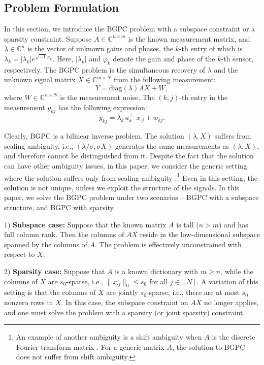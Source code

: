 \documentclass[11pt,journal]{IEEEtran}
\newcommand{\bbC}{\mathbb{C}}
\newcommand{\norm}[1]{\|{#1}\|}
\newcommand{\T}{\top}
\newcommand{\diag}{\mathrm{diag}}
\begin{document}

\subsection{Problem Formulation} \label{sec:formulation}
In this section, we introduce the BGPC problem with a subspace constraint or a sparsity constraint. Suppose $A\in\bbC^{n\times m}$ is the known measurement matrix, and $\lambda \in\bbC^{n}$ is the vector of unknown gains and phases, the $k$-th entry of which is $\lambda_k = |\lambda_k|e^{\sqrt{-1}\varphi_k}$. Here, $|\lambda_k|$ and $\varphi_k$ denote the gain and phase of the $k$-th sensor, respectively. The BGPC problem is the simultaneous recovery of $\lambda$ and the unknown signal matrix $X\in\bbC^{m\times N}$ from the following measurement:
\begin{equation}
\label{eq:bgpc}
Y = \diag(\lambda) A X + W,
\end{equation}
where $W\in\bbC^{n\times N}$ is the measurement noise. The $(k,j)$-th entry in the measurement $y_{kj}$ has the following expression:
\[
y_{kj} = \lambda_k \, a_{k \cdot}^\T \, x_{\cdot j} + w_{kj}.
\]

Clearly, BGPC is a bilinear inverse problem. The solution $(\lambda,X)$ suffers from scaling ambiguity, i.e., $(\lambda/\sigma,\sigma X)$ generates the same measurements as $(\lambda,X)$, and therefore cannot be distinguished from it.
Despite the fact that the solution can have other ambiguity issues, in this paper, we consider the generic setting where the solution suffers only from scaling ambiguity \cite{Li2015e}.\footnote{An example of another ambiguity is a shift ambiguity when $A$ is the discrete Fourier transform matrix \cite{Li2015,Wang2016}. For a generic matrix $A$, the solution to BGPC does not suffer from shift ambiguity.} Even in this setting, the solution is not unique, unless we exploit the structure of the signals. In this paper, we solve the BGPC problem under two scenarios -- BGPC with a subspace structure, and BGPC with sparsity.

1) \textbf{Subspace case:} Suppose that the known matrix $A$ is tall ($n>m$) and has full column rank. Then the columns of $AX$ reside in the low-dimensional subspace spanned by the columns of $A$. The problem is effectively unconstrained with respect to $X$.

2) \textbf{Sparsity case:} Suppose that $A$ is a known dictionary with $m \geq n$, while the columns of $X$ are $s_0$-sparse, i.e., $\norm{x_{\cdot j}}_0 \leq s_0$ for all $j\in [N]$. A variation of this setting is that the columns of $X$ are jointly $s_0$-sparse, i.e., there are at most $s_0$ nonzero rows in $X$. In this case, the subspace constraint on $AX$ no longer applies, and one must solve the problem with a sparsity (or joint sparsity) constraint.
\end{document}
